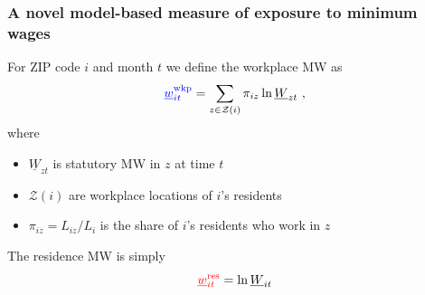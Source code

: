 \documentclass[aspectratio=169, t]{beamer}
\newcommand{\Z}{\mathcal{Z}}
\newcommand{\MW}{\underline{W}}
\newcommand{\mw}{\underline{w}}
\newcommand{\wkp}{\text{wkp}}
\newcommand{\res}{\text{res}}
\begin{document}
\begin{frame}
\frametitle{A novel model-based measure of exposure to minimum wages}

    For ZIP code $i$ and month $t$ we define the {\color{blue} workplace MW} as
    $$
    {\color{blue} \mw^{\wkp}_{it}} = 
    \sum_{z \in \Z(i)} \pi_{i z} \ln \MW_{zt} \ ,
    $$
    \vspace{-2.5mm}
    where
    \vspace{1mm}
    \begin{itemize} \small
        \item $\MW_{zt}$ is statutory MW in $z$ at time $t$
        \item $\Z(i)$ are workplace locations of $i$'s residents
        \item $\pi_{i z} = L_{i z}/L_i$ is the share of $i$'s residents who work 
        in $z$
    \end{itemize}

    \vspace{3mm}
    The {\color{red} residence MW} is simply
    $$
    {\color{red} \mw^{\res}_{it}} = \ln \MW_{it}
    $$
\end{frame}
\end{document}
